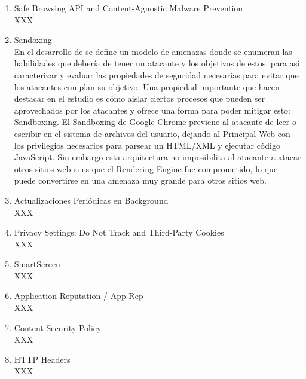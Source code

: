     \begin{enumerate}
        \item Safe Browsing API and Content-Agnostic Malware Prevention
        \\XXX 

        \item Sandoxing
        \\En el desarrollo de \cite{barth2008security} se define un modelo de amenazas donde se enumeran las habilidades que debería de tener un atacante y los objetivos de estos, para así caracterizar y evaluar las propiedades de seguridad necesarias para evitar que los atacantes cumplan su objetivo. Una propiedad importante que hacen destacar en el estudio es cómo aislar ciertos procesos que pueden ser aprovechados por los atacantes y ofrece una forma para poder mitigar esto: Sandboxing. El Sandboxing de Google Chrome previene al atacante de leer o escribir en el sistema de archivos del usuario, dejando al Principal Web con los privilegios necesarios para parsear un HTML/XML y ejecutar código JavaScript. Sin embargo esta arquitectura no imposibilita al atacante a atacar otros sitios web si es que el Rendering Engine fue comprometido, lo que puede convertirse en una amenaza muy grande para otros sitios web.

        \item Actualizaciones Periódicas en Background
        \\XXX

        \item Privacy Settings: Do Not Track and Third-Party Cookies
        \\XXX


        \item SmartScreen
        \\XXX
        
        \item Application Reputation / App Rep
        \\XXX


        \item Content Security Policy
        \\XXX


        \item HTTP Headers
        \\XXX

    \end{enumerate}



